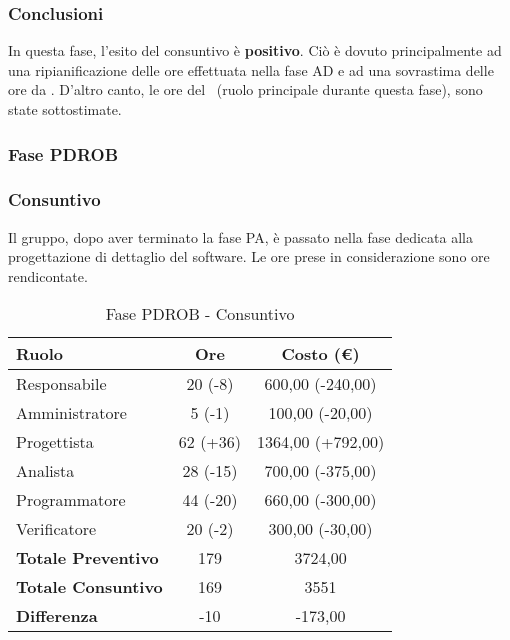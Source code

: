 \documentclass[../PianoProgetto.tex]{subfiles}
\begin{document}
	\subsubsection{Conclusioni}	
     In questa fase, l'esito del consuntivo è \textbf{positivo}. 
     Ciò è dovuto principalmente ad una ripianificazione delle ore effettuata nella fase AD e ad una sovrastima delle ore da \analista. D'altro canto, le ore del \progettista\ (ruolo principale durante questa fase), sono state sottostimate.
     
	\subsubsection{Fase PDROB}
	\subsubsection{Consuntivo}
	Il gruppo, dopo aver terminato la fase PA, è passato nella fase dedicata alla progettazione di dettaglio del software\g. Le ore prese in considerazione sono ore rendicontate. 
	
	\begin{table}[h]
		\centering
		\begin{tabular}{l * {2}{c}}
			\toprule
			\textbf{Ruolo} & \textbf{Ore} & \textbf{Costo (\euro{})} \\
			\midrule
			Responsabile &		20 (-8) & 600,00  (-240,00) \\
			Amministratore &	5 (-1) & 100,00  (-20,00) \\
			Progettista & 		62 (+36) & 1364,00  (+792,00)\\
			Analista & 			28	(-15)	& 700,00   (-375,00)       \\
			Programmatore & 	44	(-20)	& 660,00 	(-300,00)			\\
			Verificatore & 		20 (-2) & 300,00 (-30,00)	\\
			\midrule
			\textbf{Totale Preventivo} & 179
			& 3724,00
			\\		
			\textbf{Totale Consuntivo} & 169 & 3551 
			\\
			\midrule
			\textbf{Differenza} & -10 & -173,00 \\
			\bottomrule
		\end{tabular}
		
		\caption{Fase PDROB - Consuntivo}
		\label{tab:consuntivoPDROB}
		
	\end{table}	
	
\end{document}
